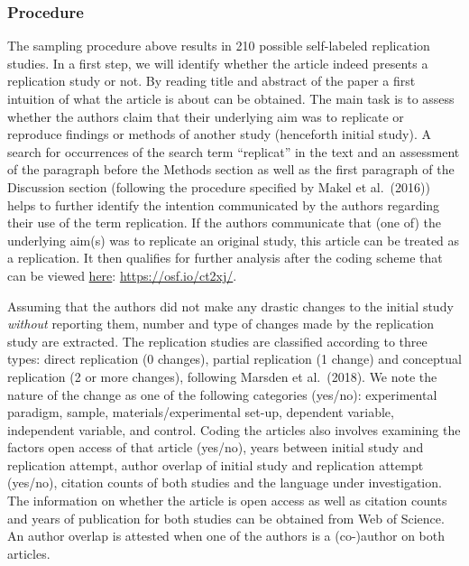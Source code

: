 \documentclass[
  english,
  man]{apa6}
\begin{document}
\hypertarget{procedure-1}{%
\subsubsection{Procedure}\label{procedure-1}}

The sampling procedure above results in 210 possible self-labeled replication studies.
In a first step, we will identify whether the article indeed presents a replication study or not.
By reading title and abstract of the paper a first intuition of what the article is about can be obtained.
The main task is to assess whether the authors claim that their underlying aim was to replicate or reproduce findings or methods of another study (henceforth initial study).
A search for occurrences of the search term \enquote{replicat} in the text and an assessment of the paragraph before the Methods section as well as the first paragraph of the Discussion section (following the procedure specified by Makel et al.~(2016)) helps to further identify the intention communicated by the authors regarding their use of the term replication.
If the authors communicate that (one of) the underlying aim(s) was to replicate an original study, this article can be treated as a replication.
It then qualifies for further analysis after the coding scheme that can be viewed \href{https://osf.io/ct2xj/}{here}: \url{https://osf.io/ct2xj/}.

Assuming that the authors did not make any drastic changes to the initial study \emph{without} reporting them, number and type of changes made by the replication study are extracted.
The replication studies are classified according to three types: direct replication (0 changes), partial replication (1 change) and conceptual replication (2 or more changes), following Marsden et al.~(2018).
We note the nature of the change as one of the following categories (yes/no): experimental paradigm, sample, materials/experimental set-up, dependent variable, independent variable, and control.
Coding the articles also involves examining the factors open access of that article (yes/no), years between initial study and replication attempt, author overlap of initial study and replication attempt (yes/no), citation counts of both studies and the language under investigation.
The information on whether the article is open access as well as citation counts and years of publication for both studies can be obtained from Web of Science.
An author overlap is attested when one of the authors is a (co-)author on both articles.
\end{document}
